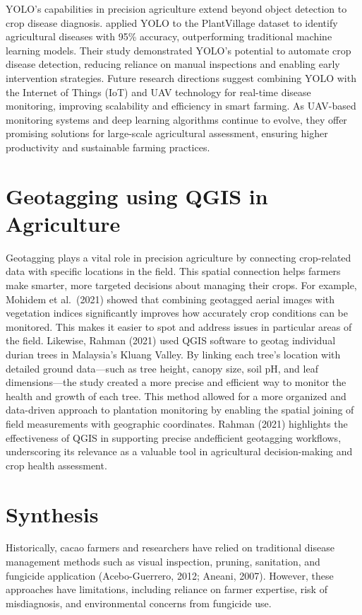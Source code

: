 YOLO’s capabilities in precision agriculture extend beyond object detection to crop disease diagnosis. \cite{vyas2023} applied YOLO to the PlantVillage dataset to identify agricultural diseases with 95\% accuracy, outperforming traditional machine learning models. Their study demonstrated YOLO’s potential to automate crop disease detection, reducing reliance on manual inspections and enabling early intervention strategies. Future research directions suggest combining YOLO with the Internet of Things (IoT) and UAV technology for real-time disease monitoring, improving scalability and efficiency in smart farming. As UAV-based monitoring systems and deep learning algorithms continue to evolve, they offer promising solutions for large-scale agricultural assessment, ensuring higher productivity and sustainable farming practices.




\section{Geotagging using QGIS in Agriculture}
Geotagging plays a vital role in precision agriculture by connecting crop-related data with specific locations in the field. This spatial connection helps farmers make smarter, more targeted decisions about managing their crops. For example, Mohidem et al.\ (2021) showed that combining geotagged aerial images with vegetation indices significantly improves how accurately crop conditions can be monitored. This makes it easier to spot and address issues in particular areas of the field. Likewise, Rahman (2021) used QGIS software to geotag individual durian trees in Malaysia’s Kluang Valley. By linking each tree’s location with detailed ground data—such as tree height, canopy size, soil pH, and leaf dimensions—the study created a more precise and efficient way to monitor the health and growth of each tree. This method allowed for a more organized and data-driven approach to plantation monitoring by enabling the spatial joining of field measurements with geographic coordinates. Rahman (2021) highlights the effectiveness of QGIS in supporting precise andefficient geotagging workflows, underscoring its relevance as a valuable tool in agricultural decision-making and crop health assessment.


\section{Synthesis}
Historically, cacao farmers and researchers have relied on traditional disease management methods such as visual inspection, pruning, sanitation, and fungicide application (Acebo-Guerrero, 2012; Aneani, 2007). However, these approaches have limitations, including reliance on farmer expertise, risk of misdiagnosis, and environmental concerns from fungicide use.

